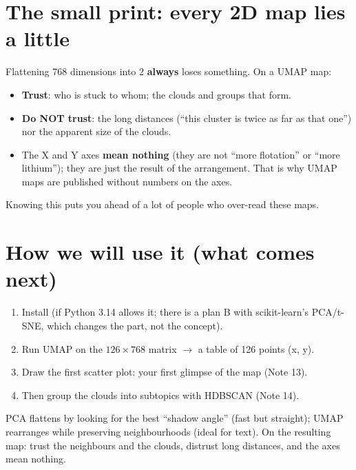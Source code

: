 \documentclass[11pt,a4paper]{article}
\begin{document}
\section{The small print: every 2D map lies a little}

\begin{ojo}
Flattening 768 dimensions into 2 \textbf{always} loses something. On a UMAP map:
\begin{itemize}
  \item \textbf{Trust}: who is stuck to whom; the clouds and groups that form.
  \item \textbf{Do NOT trust}: the long distances (``this cluster is twice as far as that
        one'') nor the apparent size of the clouds.
  \item The X and Y axes \textbf{mean nothing} (they are not ``more flotation'' or ``more
        lithium''); they are just the result of the arrangement. That is why UMAP maps are
        published without numbers on the axes.
\end{itemize}
Knowing this puts you ahead of a lot of people who over-read these maps.
\end{ojo}

\section{How we will use it (what comes next)}

\begin{enumerate}
  \item Install  (if Python 3.14 allows it; there is a plan B with
        scikit-learn's PCA/t-SNE, which changes the part, not the concept).
  \item Run UMAP on the $126 \times 768$ matrix $\rightarrow$ a table of 126 points (x, y).
  \item Draw the first scatter plot: your first glimpse of the map (Note 13).
  \item Then group the clouds into subtopics with HDBSCAN (Note 14).
\end{enumerate}

\begin{resumen}
PCA flattens by looking for the best ``shadow angle'' (fast but straight); UMAP rearranges
while preserving neighbourhoods (ideal for text). On the resulting map: trust the neighbours
and the clouds, distrust long distances, and the axes mean nothing.
\end{resumen}
\clearpage
{}
{}
\end{document}
